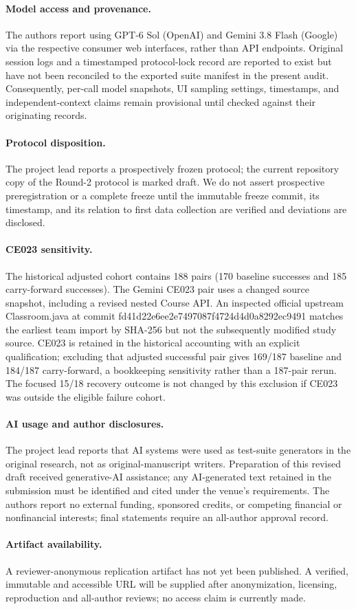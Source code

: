 \paragraph{Model access and provenance.}
The authors report using GPT-6 Sol (OpenAI) and Gemini 3.8 Flash (Google) via the respective consumer web interfaces, rather than API endpoints. Original session logs and a timestamped protocol-lock record are reported to exist but have not been reconciled to the exported suite manifest in the present audit. Consequently, per-call model snapshots, UI sampling settings, timestamps, and independent-context claims remain provisional until checked against their originating records.

\paragraph{Protocol disposition.}
The project lead reports a prospectively frozen protocol; the current repository copy of the Round-2 protocol is marked draft. We do not assert prospective preregistration or a complete freeze until the immutable freeze commit, its timestamp, and its relation to first data collection are verified and deviations are disclosed.

\paragraph{CE023 sensitivity.}
The historical adjusted cohort contains 188 pairs (170 baseline successes and 185 carry-forward successes). The Gemini CE023 pair uses a changed source snapshot, including a revised nested Course API. An inspected official upstream Classroom.java at commit fd41d22e6ee2e7497087f4724d4d0a8292ec9491 matches the earliest team import by SHA-256 but not the subsequently modified study source. CE023 is retained in the historical accounting with an explicit qualification; excluding that adjusted successful pair gives 169/187 baseline and 184/187 carry-forward, a bookkeeping sensitivity rather than a 187-pair rerun. The focused 15/18 recovery outcome is not changed by this exclusion if CE023 was outside the eligible failure cohort.

\paragraph{AI usage and author disclosures.}
The project lead reports that AI systems were used as test-suite generators in the original research, not as original-manuscript writers. Preparation of this revised draft received generative-AI assistance; any AI-generated text retained in the submission must be identified and cited under the venue's requirements. The authors report no external funding, sponsored credits, or competing financial or nonfinancial interests; final statements require an all-author approval record.

\paragraph{Artifact availability.}
A reviewer-anonymous replication artifact has not yet been published. A verified, immutable and accessible URL will be supplied after anonymization, licensing, reproduction and all-author reviews; no access claim is currently made.
